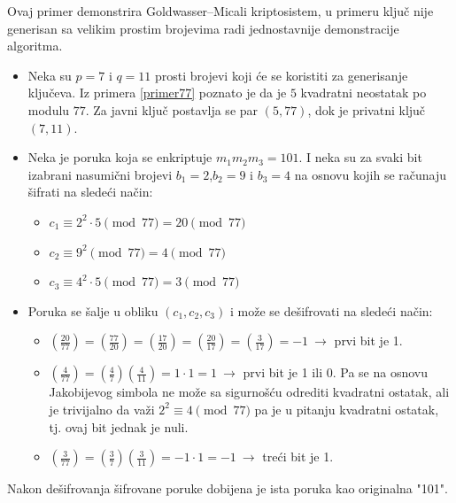 \begin{npra}
	\label{GMprm}
	Ovaj primer demonstrira \textenglish{Goldwasser–Micali} kriptosistem, u primeru ključ nije generisan sa velikim prostim brojevima radi jednostavnije demonstracije algoritma.
	\begin{itemize}
		\item Neka su $p=7$ i $q=11$ prosti brojevi koji će se koristiti za generisanje ključeva. Iz primera \ref{primer77} poznato je da je $5$ kvadratni neostatak po modulu $77$. Za javni ključ postavlja se par $(5,77)$, dok je privatni ključ $(7,11)$.
		\item Neka je poruka koja se enkriptuje $m_{1}m_{2}m_{3}=101$. I neka su za svaki bit izabrani nasumični brojevi $b_{1}=2$,$b_{2}=9$ i $b_{3}=4$ na osnovu kojih se računaju šifrati na sledeći način:
		\begin{itemize}
			\item[-] $c_{1}\equiv 2^{2}\cdot 5 \pmod{77} = 20 \pmod{77}$
			\item[-] $c_{2}\equiv 9^{2} \pmod{77} = 4 \pmod{77}$
			\item[-] $c_{3}\equiv 4^{2}\cdot 5 \pmod{77} = 3 \pmod{77}$
		\end{itemize}
		\item Poruka se šalje u obliku $(c_{1},c_{2},c_{3})$ i može se dešifrovati na sledeći način:
		\begin{itemize}
			\item[-] $\left (\frac{20}{77} \right ) = \left (\frac{77}{20} \right ) = \left (\frac{17}{20} \right ) = \left (\frac{20}{17} \right ) = \left (\frac{3}{17} \right ) = -1\ \rightarrow$ prvi bit je 1.
			\item[-] $\left (\frac{4}{77} \right ) = \left (\frac{4}{7} \right ) \left (\frac{4}{11} \right ) = 1\cdot1 = 1\ \rightarrow$ prvi bit je 1 ili 0. Pa se na osnovu Jakobijevog simbola ne može sa sigurnošću odrediti kvadratni ostatak, ali je trivijalno da važi $2^{2} \equiv 4 \pmod{77}$ pa je u pitanju kvadratni ostatak, tj. ovaj bit jednak je nuli.
			\item[-] $\left (\frac{3}{77} \right ) = \left (\frac{3}{7} \right )\left (\frac{3}{11} \right ) = -1 \cdot 1 = -1\ \rightarrow$ treći bit je 1.
		\end{itemize}
	\end{itemize}
	Nakon dešifrovanja šifrovane poruke dobijena je ista poruka kao originalna "101".
\end{npra}

